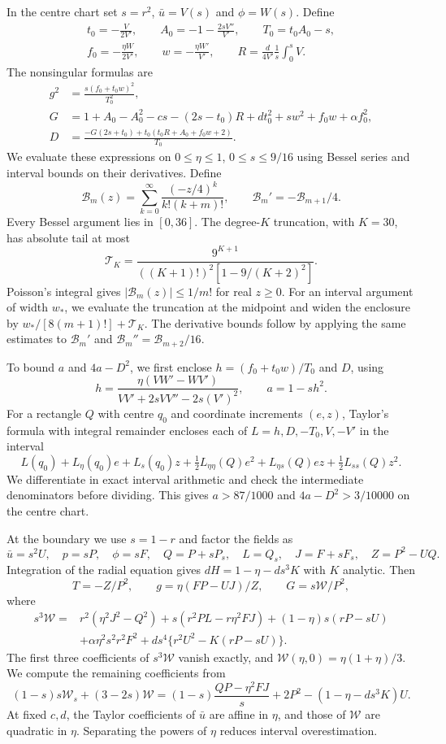 \documentclass[a4paper,11pt]{amsart}
\numberwithin{equation}{section}
\theoremstyle{plain}
\theoremstyle{definition}
\begin{document}
In the centre chart set $s=r^2$, $\bar u=V(s)$ and $\phi=W(s)$.
Define
\begin{gather*}
 t_0=-\frac{V}{2V'},\qquad A_0=-1-\frac{2sV''}{V'},\qquad
 T_0=t_0A_0-s,\\
 f_0=-\frac{\eta W}{2V'},\qquad
 w=-\frac{\eta W'}{V'},\qquad
 R=\frac{d}{4V'}\frac1s\int_0^sV.
\end{gather*}
The nonsingular formulas are
\begin{align*}
 g^2&=\frac{s(f_0+t_0w)^2}{T_0^2},\\
 G&=1+A_0-A_0^2-cs-(2s-t_0)R+dt_0^2
             +sw^2+f_0w+\alpha f_0^2,\\
 D&=\frac{-G(2s+t_0)+t_0(t_0R+A_0+f_0w+2)}{T_0}.
\end{align*}
We evaluate these expressions on \(0\le\eta\le1\), \(0\le s\le9/16\)
using Bessel series and interval bounds on their derivatives. Define
\[
 \mathcal B_m(z)=\sum_{k=0}^{\infty}\frac{(-z/4)^k}{k!(k+m)!},
 \qquad \mathcal B_m'=-\mathcal B_{m+1}/4.
\]
Every Bessel argument lies in $[0,36]$. The degree-$K$ truncation,
with $K=30$, has absolute tail at most
\[
 \mathcal T_K=\frac{9^{K+1}}{((K+1)!)^2[1-9/(K+2)^2]}.
\]
Poisson's integral gives \(|\mathcal B_m(z)|\le1/m!\) for real \(z\ge0\).
For an interval argument of width \(w_*\), we evaluate the
truncation at the midpoint and widen the enclosure by
\(w_*/[8(m+1)!]+\mathcal T_K\). The derivative bounds follow by
applying the same estimates to \(\mathcal B_m'\) and
\(\mathcal B_m''=\mathcal B_{m+2}/16\).

To bound \(a\) and \(4a-D^2\), we first enclose
\(h=(f_0+t_0w)/T_0\) and \(D\), using
\[
 h=\frac{\eta(VW'-WV')}{VV'+2sVV''-2s(V')^2},\qquad a=1-sh^2.
\]
For a rectangle \(Q\) with centre \(q_0\) and coordinate
increments \((e,z)\), Taylor's formula with integral remainder
encloses each of \(L=h,D,-T_0,V,-V'\) in the interval
\[
 L(q_0)+L_\eta(q_0)e+L_s(q_0)z
 +\tfrac12L_{\eta\eta}(Q)e^2+L_{\eta s}(Q)ez
 +\tfrac12L_{ss}(Q)z^2.
\]
We differentiate in exact interval arithmetic and check the
intermediate denominators before dividing. This gives
\(a>87/1000\) and \(4a-D^2>3/10000\) on the centre chart.

At the boundary we use \(s=1-r\) and factor the fields as
\[
 \bar u=s^2U,\quad p=sP,\quad\phi=sF,\quad
 Q=P+sP_s,\quad L=Q_s,\quad J=F+sF_s,
 \quad Z=P^2-UQ.
\]
Integration of the radial equation gives
$dH=1-\eta-ds^3K$ with $K$ analytic. Then
\[
 T=-Z/P^2,\qquad g=\eta(FP-UJ)/Z,\qquad G=s\mathcal W/P^2,
\]
where
\begin{align*}
 s^3\mathcal W={}&r^2(\eta^2J^2-Q^2)
  +s(r^2PL-r\eta^2FJ)+(1-\eta)s(rP-sU)\\
 &+\alpha\eta^2s^2r^2F^2
  +ds^4\{r^2U^2-K(rP-sU)\}.
\end{align*}
The first three coefficients of \(s^3\mathcal W\) vanish
exactly, and \(\mathcal W(\eta,0)=\eta(1+\eta)/3\).
We compute the remaining coefficients from
\[
 (1-s)s\mathcal W_s+(3-2s)\mathcal W
 =(1-s)\frac{QP-\eta^2FJ}{s}+2P^2-(1-\eta-ds^3K)U.
\]
At fixed $c,d$, the Taylor coefficients of $\bar u$ are affine
in $\eta$, and those of $\mathcal W$ are quadratic in $\eta$.
Separating the powers of \(\eta\) reduces interval overestimation.
\end{document}
